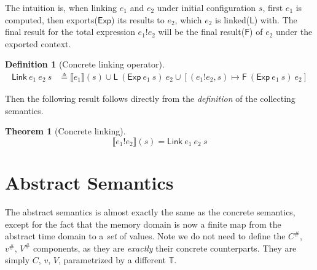 \documentclass[acmsmall,screen,review]{acmart}
\theoremstyle{definition}
\newtheorem{definition}{Definition}[section]
\newtheorem{thm}{Theorem}[section]
\newcommand*{\A}[1]{{#1}^{\#}}
\newcommand*{\Time}{\mathbb{T}}
\newcommand*{\link}[2]{{#1}\mathtt{!}{#2}}
\newcommand*{\EE}{\mathsf{Exp}}
\newcommand*{\LL}{\mathsf{L}}
\newcommand*{\Link}{\mathsf{Link}}
\newcommand*{\sembracket}[1]{\lBrack{#1}\rBrack}
\begin{document}
The intuition is, when linking $e_1$ and $e_2$ under initial configuration $s$, first $e_1$ is computed, then exports($\EE$) its results to $e_2$, which $e_2$ is linked($\LL$) with.
The final result for the total expression $\link{e_1}{e_2}$ will be the final result($\mathsf{F}$) of $e_2$ under the exported context.

\begin{definition}[Concrete linking operator]
  \begin{align*}
    \Link\:e_1\:e_2\:s & \triangleq\sembracket{e_1}(s)\cup\LL\:(\EE\:e_1\:s)\:e_2\cup[(\link{e_1}{e_2},s)\mapsto\mathsf{F}\:(\EE\:e_1\:s)\:e_2]
  \end{align*}
\end{definition}

Then the following result follows directly from the \emph{definition} of the collecting semantics.

\begin{thm}[Concrete linking]
  \[
    \sembracket{\link{e_1}{e_2}}(s)=\Link\:e_1\:e_2\:s
  \]
\end{thm}

\section{Abstract Semantics}

The abstract semantics is almost exactly the same as the concrete semantics, except for the fact that the memory domain is now a finite map from the abstract time domain to a \emph{set} of values.
Note we do not need to define the $\A{C}$, $\A{v}$, $\A{V}$ components, as they are \emph{exactly} their concrete counterparts.
They are simply $C$, $v$, $V$, parametrized by a different $\Time$.
\end{document}

